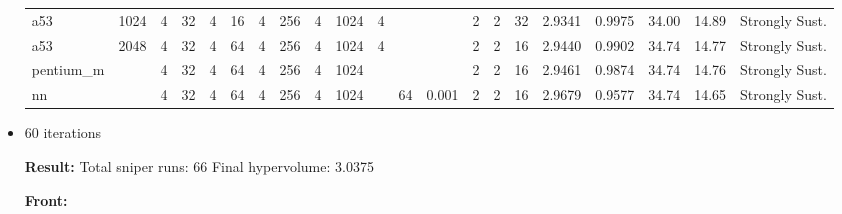 \documentclass[11pt]{article}
\begin{document}
\begin{itemize}
\begin{table}[H]
{\begin{tabular}{lllllllllllllllllllll}
a53 & 1024 & 4 & 32 & 4 & 16 & 4 & 256 & 4 & 1024 & 4 &  &  & 2 & 2 & 32 & 2.9341 & 0.9975 & 34.00 & 14.89 & Strongly Sust. \\
a53 & 2048 & 4 & 32 & 4 & 64 & 4 & 256 & 4 & 1024 & 4 &  &  & 2 & 2 & 16 & 2.9440 & 0.9902 & 34.74 & 14.77 & Strongly Sust. \\
pentium\_m &  & 4 & 32 & 4 & 64 & 4 & 256 & 4 & 1024 &  &  &  & 2 & 2 & 16 & 2.9461 & 0.9874 & 34.74 & 14.76 & Strongly Sust. \\
nn &  & 4 & 32 & 4 & 64 & 4 & 256 & 4 & 1024 &  & 64 & 0.001 & 2 & 2 & 16 & 2.9679 & 0.9577 & 34.74 & 14.65 & Strongly Sust. \\
\bottomrule
\end{tabular}
}
\end{table}

\item 60 iterations

\textbf{Result:}
\newline
Total sniper runs: 66
\newline
Final hypervolume: 3.0375

\textbf{Front:}


\end{itemize}
\end{document}
